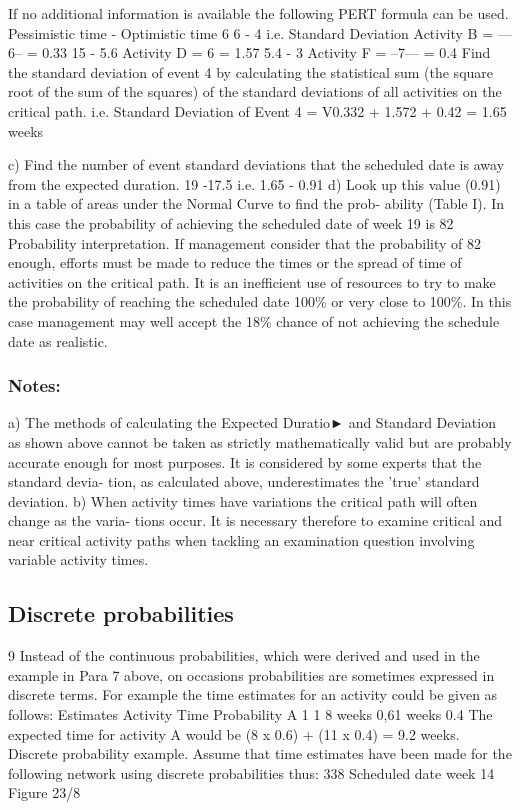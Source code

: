 \documentclass[]{report}
\begin{document}
 If no additional information is available the following PERT formula can be used. Pessimistic time - Optimistic time 
6 
6 - 4 i.e. Standard Deviation Activity B = —6-- = 0.33 
15 - 5.6 Activity D = 6 = 1.57 
5.4 - 3 Activity F = --7— = 0.4 Find the standard deviation of event 4 by calculating the statistical sum (the square root of the sum of the squares) of the standard deviations of all activities on the critical path. i.e. Standard Deviation of Event 4 = V0.332 + 1.572 + 0.42 = 1.65 weeks 

c) Find the number of event standard deviations that the scheduled date is away from 
the expected duration. 
19 -17.5 
i.e.  1.65 - 0.91 
d) Look up this value (0.91) in a table of areas under the Normal Curve to find the prob-
ability (Table I). In this case the probability of achieving the scheduled date of week 
19 is 82%
Probability interpretation. If management consider that the probability of 82%
enough, efforts must be made to reduce the times or the spread of time of activities on the 
critical path. It is an inefficient use of resources to try to make the probability of reaching 
the scheduled date 100\% or very close to 100\%. In this case management may well accept 
the 18\% chance of not achieving the schedule date as realistic. 
\subsubsection{Notes:} 
a) The methods of calculating the Expected Duratio► and Standard Deviation as shown 
above cannot be taken as strictly mathematically valid but are probably accurate 
enough for most purposes. It is considered by some experts that the standard devia-
tion, as calculated above, underestimates the 'true' standard deviation. 
b) When activity times have variations the critical path will often change as the varia-
tions occur. It is necessary therefore to examine critical and near critical activity paths 
when tackling an examination question involving variable activity times. 
\subsection{Discrete probabilities}
9 Instead of the continuous probabilities, which were derived and used in the example in 
Para 7 above, on occasions probabilities are sometimes expressed in discrete terms. For 
example the time estimates for an activity could be given as follows: 
Estimates 
Activity Time Probability 
A 
1 1 
8 weeks 0,61 weeks 0.4 
The expected time for activity A would be (8 x 0.6) + (11 x 0.4) = 9.2 weeks. 
Discrete probability example. Assume that time estimates have been made for the 
following network using discrete probabilities thus: 
338 
Scheduled date 
week 14 
Figure 23/8 
\end{document}
